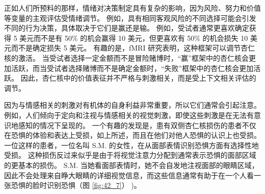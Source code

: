正如人们所预料的那样，情绪对决策制定具有复杂的影响，因为风险、努力和价值等变量的主观评估受情绪调节。 例如，具有相同客观风险的不同选择可能会引发不同的行为决策，具体取决于它们是赢还是输。 例如，受试者通常更喜欢确定获得 5 美元而不是有 50\% 的机会赢得 10 美元，但更喜欢有 50\% 的机会损失 10 美元而不是确定损失 5 美元。 有趣的是，fMRI 研究表明，这种框架可以调节杏仁核的激活。 当受试者选择一定金额而不是冒险赌博时，“赢”框架中的杏仁核会更加活跃，而当受试者选择赌博而不是确定金额时，“失败”框架中的杏仁核会更加活跃。 因此，杏仁核中的价值表征并不严格与刺激相关，而是受上下文相关评估的调节。

因为与情感相关的刺激对有机体的自身利益非常重要，所以它们通常会引起注意。 例如，人们倾向于定向和注视与情感相关的视觉刺激，即使这些刺激是在无法有意识地感知的情况下呈现的。 一个有趣的发现是，患有双侧杏仁核损伤的患者不仅在恐惧的体验和表达上受损，如上所述，而且在他们对他人恐惧的认识上也受损。 一位这样的患者，一位名叫 S.M. 的女性，在从面部表情识别恐惧方面有选择性地受损。 这种损伤反过来似乎是由于将视觉注意力分配到通常表示恐惧的面部区域的更基本的损伤。 
S.M. 当她看面部表情时，她不会自发地注视面部的眼睛区域，因此不会处理来自睁大眼睛的详细视觉信息，而这些信息通常有助于在一个人看一张恐惧的脸时识别恐惧（图 \ref{fig:42_7}） )。

